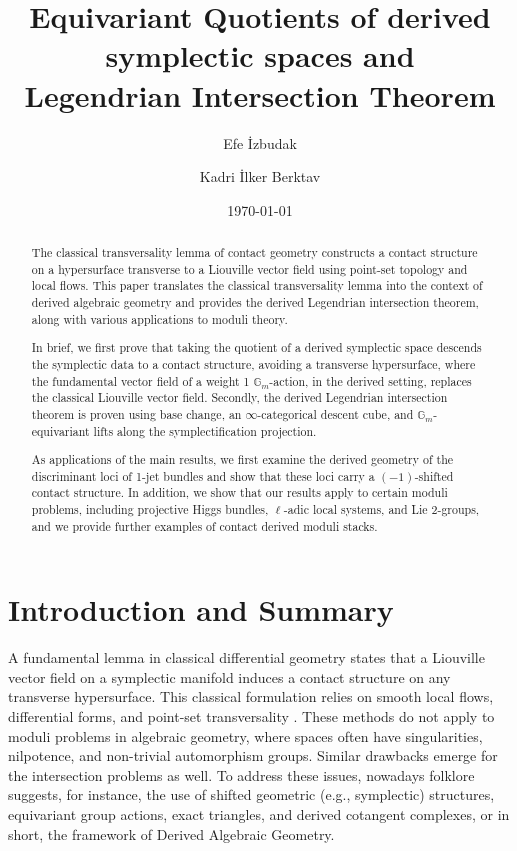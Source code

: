 \documentclass[reqno]{amsart}
\theoremstyle{definition}
\theoremstyle{remark}
\newcommand{\Gm}{\mathbb{G}_m}
\begin{document}
\title[Transversality and Derived Legendrian Intersections]{Equivariant Quotients of derived symplectic spaces and \\ 
Legendrian Intersection Theorem}
\author{Efe \.{I}zbudak \and Kadri \.{I}lker Berktav}
\date{\today}

\begin{abstract}
The classical transversality lemma of contact geometry constructs a contact structure on a hypersurface transverse to a  Liouville vector field using point-set topology and local flows. This paper translates the classical transversality lemma into the context of derived algebraic geometry and provides the derived Legendrian intersection theorem, along with various applications to moduli theory. 
  
In brief,  we first prove that taking the quotient of a derived symplectic space descends the symplectic data to a contact structure, avoiding a transverse hypersurface, where  the fundamental vector field of a weight 1 $\Gm$-action, in the derived setting, replaces the classical Liouville vector field.  Secondly, the derived Legendrian intersection theorem is proven using base change, an $\infty$-categorical descent cube, and $\Gm$-equivariant lifts along the symplectification projection.
  
As applications of the main results, we first examine the derived geometry of the discriminant loci of 1-jet bundles and show that these loci carry a $(-1)$-shifted contact structure. In addition, we show that our results apply to certain moduli problems, including projective Higgs bundles, $\ell$-adic local systems, and Lie 2-groups, and we provide further examples of contact derived moduli stacks.
\end{abstract}

\maketitle
\tableofcontents

\section{Introduction and Summary}

A fundamental lemma in classical differential geometry \cite[Lemma 1.4.5]{Geiges} states that a Liouville vector field on a symplectic
manifold induces a contact structure on any transverse hypersurface.
This classical formulation  relies on smooth local flows, differential forms,
and point-set transversality \cite[Section
1.4]{Geiges}. These methods do not apply to moduli
problems in algebraic geometry, where spaces often have
singularities, nilpotence, and non-trivial automorphism groups. Similar drawbacks emerge for the intersection problems as well.
To address these issues,  nowadays folklore suggests, for instance, the use of shifted geometric (e.g., symplectic) structures, equivariant group actions, exact triangles, and derived cotangent complexes, or in short, the framework of Derived Algebraic Geometry.
\end{document}
